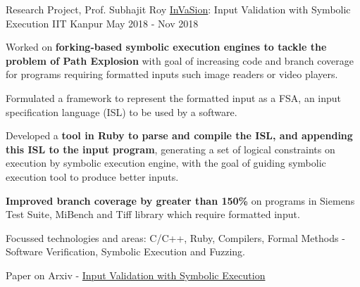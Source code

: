 \begin{cventries}
  \cventry
    {Research Project, Prof. Subhajit Roy} %
    {\href{https://arxiv.org/abs/2104.01438}{InVaSion}: Input Validation with Symbolic Execution} %
    {IIT Kanpur} %
    {May 2018 - Nov 2018} %
    {
      \begin{cvitems} %
      \item {Worked on \textbf{forking-based symbolic execution engines to tackle the problem of Path Explosion} with goal of increasing code and branch coverage for programs requiring formatted inputs such image readers or video players.}
      \item {Formulated a framework to represent the formatted input as a FSA, an input specification language (ISL) to be used by a software.}
        \item {Developed a \textbf{tool in Ruby to parse and compile the ISL, and appending this ISL to the input program}, generating a set of logical constraints on execution by symbolic execution engine, with the goal of guiding symbolic execution tool to produce better inputs.}
        \item {\textbf{Improved branch coverage by greater than 150\%} on programs in Siemens Test Suite, MiBench and Tiff library which require formatted input.}
        \item {Focussed technologies and areas: C/C++, Ruby, Compilers, Formal Methods - Software Verification, Symbolic Execution and Fuzzing.}
        \item {Paper on Arxiv - \href{https://arxiv.org/abs/2104.01438}{Input Validation with Symbolic Execution}}
      \end{cvitems}
    }%





\end{cventries}

